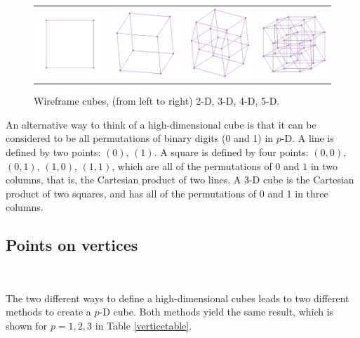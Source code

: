 \begin{figure}[ht]
\centering
\begin{tabular}{cccc}
\includegraphics[width=1in]{fig/cube2D.pdf} & \includegraphics[width=1in]{fig/cube3D.pdf} &
\includegraphics[width=1in]{fig/cube4D.pdf} & \includegraphics[width=1in]{fig/cube5D.pdf}
\end{tabular}
\caption{Wireframe cubes, (from left to right) 2-D, 3-D, 4-D, 5-D.}
\label{boxes}
\end{figure}

An alternative way to think of a high-dimensional cube is that it can
be considered to be all permutations of binary digits (0 and 1) in
$p$-D. A line is defined by two points: $(0)$, $(1)$. A square is
defined by four points: $(0,0)$, $(0,1)$, $(1,0)$, $(1,1)$, which are
all of the permutations of $0$ and $1$ in two columns, that is, the
Cartesian product of two lines. A 3-D cube is the Cartesian product of
two squares, and has all of the permutations of 0 and 1 in three
columns.

\subsection{Points on vertices}~\label{cube-vertices}

The two different ways to define a high-dimensional cubes leads to two
different methods to create a $p$-D cube. Both methods yield the same
result, which is shown for $p=1,2,3$ in Table \ref{verticetable}.

